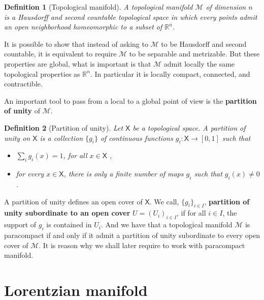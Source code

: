 \documentclass[12pt]{book}
\newcommand{\Mcal}{\mathcal{M}}
\newcommand{\Rbb}{\mathbb{R}}
\newcommand{\Xsf}{\mathsf{X}}
\theoremstyle{break}
\newtheorem{definition}{Definition}
\begin{document}
\begin{definition}[Topological manifold]
A topological manifold $\Mcal$ of dimension $n$ is a Hausdorff and second countable topological space in which every points admit an open neighborhood homeomorphic to a subset of $\Rbb^n$.
\end{definition}


It is possible to show that instead of asking to $\Mcal$ to be Hausdorff and second countable, it is equivalent to require $\Mcal$ to be separable and metrizable. But these properties are global, what is important is that $\Mcal$ admit locally the same topological properties as $\Rbb^n$. In particular it is locally compact, connected, and contractible.%




An important tool to pass from a local to a global point of view is the \textbf{partition of unity} of $\Mcal$. 


\begin{definition}[Partition of unity]
Let $\Xsf$ be a topological space. A partition of unity on $\Xsf$ is a collection $\{g_i\}$ of continuous functions $g_i : \Xsf \to [0,1]$ such that
%
\begin{itemize}
\item $\sum_i g_i(x) = 1$, for all $x \in \Xsf$ ,
\item for every $x \in \Xsf$, there is only a finite number of maps $g_i$ such that $g_i(x) \neq 0$.
\end{itemize}
%
\end{definition}


A partition of unity defines an open cover of $\Xsf$. We call, $\{g_i\}_{i \in I}$, \textbf{partition of unity subordinate to an open cover} $U=(U_i)_{i \in I}$, if for all $i \in I$, the support of $g_i$ is contained in $U_i$. And we have that a topological manifold $\Mcal$ is paracompact if and only if it admit a partition of unity subordinate to every open cover of $\Mcal$. It is reason why we shall later require to work with paracompact manifold.


\section{Lorentzian manifold}
\end{document}
